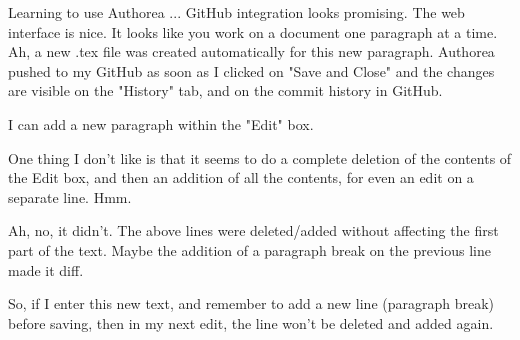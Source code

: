 Learning to use Authorea ... GitHub integration looks promising. The web interface is nice. It looks like you work on a document one paragraph at a time. Ah, a new .tex file was created automatically for this new paragraph. Authorea pushed to my GitHub as soon as I clicked on "Save and Close" and the changes are visible on the "History" tab, and on the commit history in GitHub.

I can add a new paragraph within the "Edit" box.

One thing I don't like is that it seems to do a complete deletion of the contents of the Edit box, and then an addition of all the contents, for even an edit on a separate line. Hmm.

Ah, no, it didn't. The above lines were deleted/added without affecting the first part of the text. Maybe the addition of a paragraph break on the previous line made it diff.

So, if I enter this new text, and remember to add a new line (paragraph break) before saving, then in my next edit, the line won't be deleted and added again.
